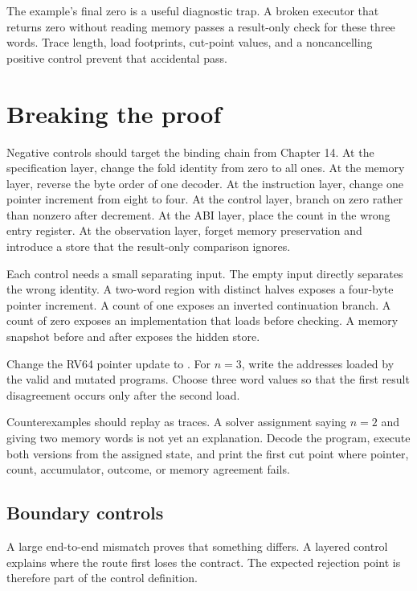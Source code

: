 The example's final zero is a useful diagnostic trap. A broken executor that
returns zero without reading memory passes a result-only check for these three
words. Trace length, load footprints, cut-point values, and a noncancelling
positive control prevent that accidental pass.

\section{Breaking the proof}

Negative controls should target the binding chain from Chapter 14. At the
specification layer, change the fold identity from zero to all ones. At the
memory layer, reverse the byte order of one decoder. At the instruction layer,
change one pointer increment from eight to four. At the control layer, branch
on zero rather than nonzero after decrement. At the ABI layer, place the count
in the wrong entry register. At the observation layer, forget memory
preservation and introduce a store that the result-only comparison ignores.

Each control needs a small separating input. The empty input directly
separates the wrong identity. A two-word region with distinct halves exposes a
four-byte pointer increment. A count of one exposes an inverted continuation
branch. A count of zero exposes an implementation that loads before checking.
A memory snapshot before and after exposes the hidden store.

\begin{tryit}[title={Find the first separating iteration}]
Change the RV64 pointer update to . For \(n=3\), write the
addresses loaded by the valid and mutated programs. Choose three word values
so that the first result disagreement occurs only after the second load.
\end{tryit}

Counterexamples should replay as traces. A solver assignment saying
\(n=2\) and giving two memory words is not yet an explanation. Decode the
program, execute both versions from the assigned state, and print the first cut
point where pointer, count, accumulator, outcome, or memory agreement fails.

\subsection{Boundary controls}

A large end-to-end mismatch proves that something differs. A layered control
explains where the route first loses the contract. The expected rejection
point is therefore part of the control definition.


